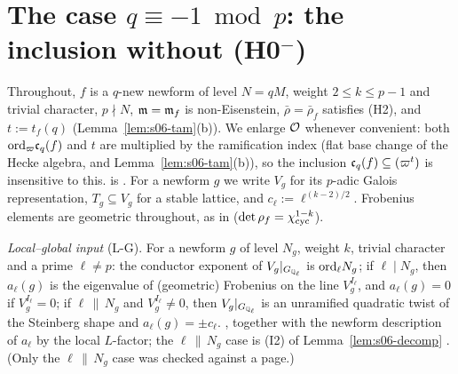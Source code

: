 \section{The case \texorpdfstring{$q\equiv-1\bmod p$}{q = -1 mod p}: the inclusion without (H0\texorpdfstring{$^-$}{-})}

Throughout, $f$ is a $q$-new newform of level $N=qM$, weight $2\le k\le p-1$ and trivial character, $p\nmid N$, $\mathfrak{m}=\mathfrak{m}_f$ is
non-Eisenstein, $\bar\rho=\bar\rho_f$ satisfies (H2), and $t:=t_f(q)$ (Lemma~\ref{lem:s06-tam}(b)). We enlarge $\mathcal{O}$ whenever
convenient: both $\mathrm{ord}_\varpi\mathfrak{c}_q(f)$ and $t$ are multiplied by the ramification index (flat base change of the Hecke algebra,
and Lemma~\ref{lem:s06-tam}(b)), so the inclusion $\mathfrak{c}_q(f)\subseteq(\varpi^t)$ is insensitive to this. \cite{KO} is
. For a newform $g$ we write $V_g$ for its $p$-adic Galois representation, $T_g\subseteq V_g$ for a stable
lattice, and $c_\ell:=\ell^{(k-2)/2}$. Frobenius elements are geometric throughout, as in \cite[p.~3]{KO} ($\det\rho_f=\chi_{\rm cyc}^{1-k}$).

\emph{Local--global input} (L-G). For a newform $g$ of level $N_g$, weight $k$, trivial character and a prime $\ell\ne p$: the conductor
exponent of $V_g|_{G_{\mathbb{Q}_\ell}}$ is $\mathrm{ord}_\ell N_g$; if $\ell\mid N_g$, then $a_\ell(g)$ is the eigenvalue of (geometric) Frobenius on the
line $V_g^{I_\ell}$, and $a_\ell(g)=0$ if $V_g^{I_\ell}=0$; if $\ell\,\|\,N_g$ and $V_g^{I_\ell}\ne0$, then $V_g|_{G_{\mathbb{Q}_\ell}}$ is an
unramified quadratic twist of the Steinberg shape and $a_\ell(g)=\pm c_\ell$. \stcited{} \cite[Th.~(A)]{Car86}
,
together with the newform description of $a_\ell$ by the local $L$-factor; the $\ell\,\|\,N_g$ case is (I2) of
Lemma~\ref{lem:s06-decomp} \cite[Thm~3.1(e)]{DDT97}. (Only the $\ell\,\|\,N_g$ case was checked against a page.)

